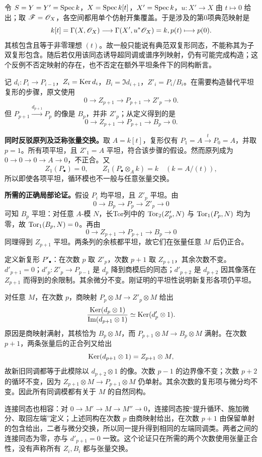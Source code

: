 令 $S=Y=Y'=\operatorname{Spec} k$，$X=\operatorname{Spec} k[t]$，$X'=\operatorname{Spec} k$，$u:X'\to X$ 由 $t\mapsto0$ 给出；取 $\mathscr F=\mathscr O_X$，各空间都用单个仿射开集覆盖。于是涉及的第0项典范映射是
\[
 k[t]=\Gamma(X,\mathscr O_X)
 \longrightarrow\Gamma(X',u^*\mathscr O_X)=k,
  p(t)\longmapsto p(0).
\]
其核包含且等于非零理想 $(t)$。故一般只能说有典范双复形同态，不能称其为子双复形包含。随后若仅用该同态诱导超同调或谱序列映射，仍有可能完成构造；这个反例不否定映射的存在，也不否定在额外平坦条件下的同构断言。

记 $d_i:P_i\to P_{i-1}$，$Z_i=\operatorname{Ker} d_i$，$B_i=\Im d_{i+1}$，$Z'_i=P_i/B_i$。在需要构造替代平坦复形的步骤，原文使用
\[
 0\to Z_{p+1}\to P_{p+1}\to Z'_p\to0.
\]
但 $P_{p+1}\xrightarrow{d_{p+1}}P_p$ 的像是 $B_p$，并非 $Z'_p$；从定义得到的是
\[
 0\to Z_{p+1}\to P_{p+1}\to B_p\to0.
\]

\textbf{同时反驳原列及泛称张量交换。}取 $A=k[t]$，复形仅有 $P_1=A\xrightarrow{t}P_0=A$，并取 $p=1$。所有项平坦，且 $Z'_1=A$ 平坦，符合该步骤的假设。然而原列成为 $0\to0\to0\to A\to0$，不正合。又
\[
 Z_1(P_\bullet)=0,
 \qquad Z_1(P_\bullet\otimes_A k)=k
 \quad(k=A/(t)),
\]
所以即使各项平坦，循环模也不一般与任意张量交换。

\textbf{所需的正确局部论证。}假设 $P_i$ 均平坦，且 $Z'_p$ 平坦。由
\[
 0\to B_p\to P_p\to Z'_p\to0
\]
可知 $B_p$ 平坦：对任意 $A$-模 $N$，长Tor列中的 $\operatorname{Tor}_2(Z'_p,N)$ 与 $\operatorname{Tor}_1(P_p,N)$ 均为零，故 $\operatorname{Tor}_1(B_p,N)=0$。再由
\[
 0\to Z_{p+1}\to P_{p+1}\to B_p\to0
\]
同理得到 $Z_{p+1}$ 平坦。两条列的余核都平坦，故它们在张量任意 $M$ 后仍正合。

定义新复形 $P'_\bullet$：在次数 $p$ 取 $Z'_p$，次数 $p+1$ 取 $Z_{p+1}$，其余次数不变。$d'_{p+1}=0$；$d'_p:Z'_p\to P_{p-1}$ 是 $d_p$ 降到商模后的同态；$d'_{p+2}$ 是 $d_{p+2}$ 因其像落在 $Z_{p+1}$ 而得到的余限制。其余微分不变。刚证明的平坦性说明新复形各项仍平坦。

对任意 $M$，在次数 $p$，商映射 $P_p\otimes M\to Z'_p\otimes M$ 给出
\[
 \frac{\operatorname{Ker}(d_p\otimes1)}{\operatorname{Im}(d_{p+1}\otimes1)}
 \simeq\operatorname{Ker}(d'_p\otimes1).
\]
原因是商映射满射，其核恰为 $B_p\otimes M$，而 $P_{p+1}\otimes M\to B_p\otimes M$ 满射。在次数 $p+1$，两条张量后的正合列又给出
\[
 \operatorname{Ker}(d_{p+1}\otimes1)=Z_{p+1}\otimes M,
\]
故新旧同调都等于此模除以 $d_{p+2}\otimes1$ 的像。次数 $p-1$ 的边界像不变；次数 $p+2$ 的循环不变，因为 $Z_{p+1}\otimes M\to P_{p+1}\otimes M$ 仍单射。其余次数的复形项与微分均不变。因此所有同调模都有关于 $M$ 的自然同构。

连接同态也相容：对 $0\to M'\to M\to M''\to0$，连接同态按“提升循环、施加微分、取回左端”定义；上述同构在次数 $p$ 由商映射给出，在次数 $p+1$ 由保留单射的包含给出，二者与微分交换，所以同一提升得到相同的左端同调类。两者之间的连接同态为零，亦与 $d'_{p+1}=0$ 一致。这个论证只在所需的两个次数使用张量正合性，没有声称所有 $Z_i,B_i$ 都与张量交换。

